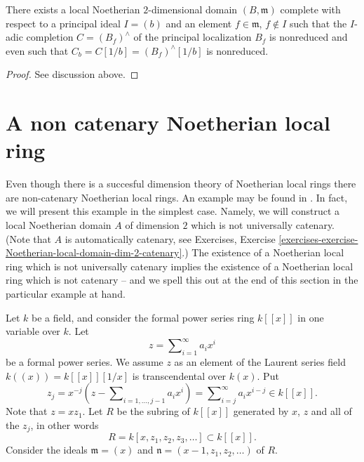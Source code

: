 \begin{lemma}
\label{lemma-nonreduced-recompletion}
There exists a local Noetherian $2$-dimensional domain $(B, \mathfrak m)$
complete with respect to a principal ideal $I = (b)$ and an
element $f \in \mathfrak m$, $f \not \in I$ such that
the $I$-adic completion $C = (B_f)^\wedge$ of the principal
localization $B_f$ is nonreduced and even such that
$C_b = C[1/b] = (B_f)^\wedge[1/b]$ is nonreduced.
\end{lemma}

\begin{proof}
See discussion above.
\end{proof}








\section{A non catenary Noetherian local ring}
\label{section-non-catenary-Noetherian-local}

\noindent
Even though there is a succesful dimension theory of Noetherian local rings
there are non-catenary Noetherian local rings. An example may be found in
\cite[Appendix, Example 2]{Nagata}. In fact, we will present this example
in the simplest case. Namely, we will construct a local Noetherian domain $A$
of dimension $2$ which is not universally catenary. (Note that $A$ is
automatically catenary, see
Exercises, Exercise
\ref{exercises-exercise-Noetherian-local-domain-dim-2-catenary}.)
The existence of a Noetherian local ring which is not universally
catenary implies the existence of a Noetherian local ring which
is not catenary -- and we spell this out at the end of this section
in the particular example at hand.

\medskip\noindent
Let $k$ be a field, and consider the formal power series ring
$k[[x]]$ in one variable over $k$. Let
$$
z = \sum\nolimits_{i = 1}^\infty a_i x^i
$$
be a formal power series. We assume $z$ as an element of the Laurent
series field $k((x)) = k[[x]][1/x]$ is transcendental over $k(x)$.
Put
$$
z_j
=
x^{-j}(z - \sum\nolimits_{i = 1, \ldots, j - 1} a_i x^i)
=
\sum\nolimits_{i = j}^\infty a_i x^{i - j}
\in k[[x]].
$$
Note that $z = xz_1$.
Let $R$ be the subring of $k[[x]]$ generated by $x$, $z$ and all of the
$z_j$, in other words
$$
R = k[x, z_1, z_2, z_3, \ldots ] \subset k[[x]].
$$
Consider the ideals $\mathfrak m = (x)$ and
$\mathfrak n = (x - 1, z_1, z_2, \ldots)$ of $R$.

